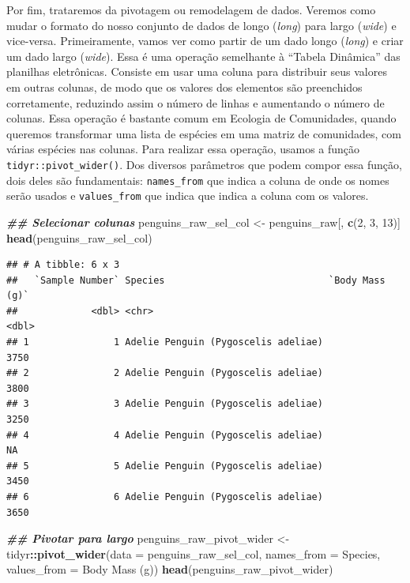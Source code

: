 \documentclass[
]{article}
\newenvironment{Shaded}{\begin{snugshade}}{\end{snugshade}}
\newcommand{\AttributeTok}[1]{\textcolor[rgb]{0.13,0.29,0.53}{#1}}
\newcommand{\DecValTok}[1]{\textcolor[rgb]{0.00,0.00,0.81}{#1}}
\newcommand{\DocumentationTok}[1]{\textcolor[rgb]{0.56,0.35,0.01}{\textbf{\textit{#1}}}}
\newcommand{\FunctionTok}[1]{\textcolor[rgb]{0.13,0.29,0.53}{\textbf{#1}}}
\newcommand{\NormalTok}[1]{#1}
\newcommand{\OtherTok}[1]{\textcolor[rgb]{0.56,0.35,0.01}{#1}}
\newcommand{\SpecialCharTok}[1]{\textcolor[rgb]{0.81,0.36,0.00}{\textbf{#1}}}
\newcommand{\StringTok}[1]{\textcolor[rgb]{0.31,0.60,0.02}{#1}}
\begin{document}
Por fim, trataremos da pivotagem ou remodelagem de dados. Veremos como mudar o formato do nosso conjunto de dados de longo (\emph{long}) para largo (\emph{wide}) e vice-versa. Primeiramente, vamos ver como partir de um dado longo (\emph{long}) e criar um dado largo (\emph{wide}). Essa é uma operação semelhante à ``Tabela Dinâmica'' das planilhas eletrônicas. Consiste em usar uma coluna para distribuir seus valores em outras colunas, de modo que os valores dos elementos são preenchidos corretamente, reduzindo assim o número de linhas e aumentando o número de colunas. Essa operação é bastante comum em Ecologia de Comunidades, quando queremos transformar uma lista de espécies em uma matriz de comunidades, com várias espécies nas colunas. Para realizar essa operação, usamos a função \texttt{tidyr::pivot\_wider()}. Dos diversos parâmetros que podem compor essa função, dois deles são fundamentais: \texttt{names\_from} que indica a coluna de onde os nomes serão usados e \texttt{values\_from} que indica que indica a coluna com os valores.

\begin{Shaded}
\begin{Highlighting}[]
\DocumentationTok{\#\# Selecionar colunas}
\NormalTok{penguins\_raw\_sel\_col }\OtherTok{\textless{}{-}}\NormalTok{ penguins\_raw[, }\FunctionTok{c}\NormalTok{(}\DecValTok{2}\NormalTok{, }\DecValTok{3}\NormalTok{, }\DecValTok{13}\NormalTok{)]}
\FunctionTok{head}\NormalTok{(penguins\_raw\_sel\_col)}
\end{Highlighting}
\end{Shaded}

\begin{verbatim}
## # A tibble: 6 x 3
##   `Sample Number` Species                             `Body Mass (g)`
##             <dbl> <chr>                                         <dbl>
## 1               1 Adelie Penguin (Pygoscelis adeliae)            3750
## 2               2 Adelie Penguin (Pygoscelis adeliae)            3800
## 3               3 Adelie Penguin (Pygoscelis adeliae)            3250
## 4               4 Adelie Penguin (Pygoscelis adeliae)              NA
## 5               5 Adelie Penguin (Pygoscelis adeliae)            3450
## 6               6 Adelie Penguin (Pygoscelis adeliae)            3650
\end{verbatim}

\begin{Shaded}
\begin{Highlighting}[]
\DocumentationTok{\#\# Pivotar para largo}
\NormalTok{penguins\_raw\_pivot\_wider }\OtherTok{\textless{}{-}}\NormalTok{ tidyr}\SpecialCharTok{::}\FunctionTok{pivot\_wider}\NormalTok{(}\AttributeTok{data =}\NormalTok{ penguins\_raw\_sel\_col, }
                                               \AttributeTok{names\_from =}\NormalTok{ Species, }
                                               \AttributeTok{values\_from =} \StringTok{\textasciigrave{}}\AttributeTok{Body Mass (g)}\StringTok{\textasciigrave{}}\NormalTok{)}
\FunctionTok{head}\NormalTok{(penguins\_raw\_pivot\_wider)}
\end{Highlighting}
\end{Shaded}
\end{document}
